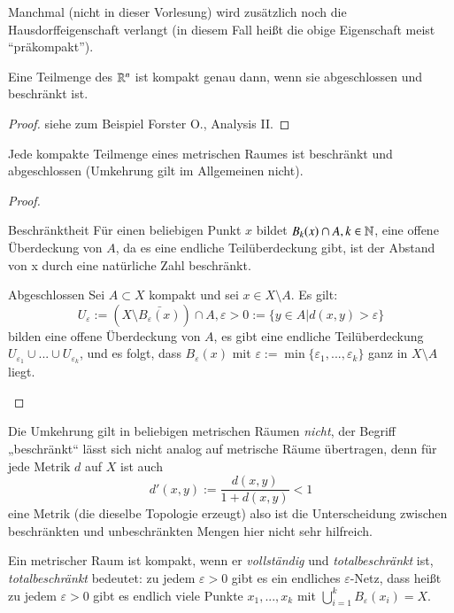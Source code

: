 \documentclass[a4paper,10pt]{scrartcl}
\newcommand{\eps}{\varepsilon}
\begin{document}
\begin{note}\label{thm:6.3}
 Manchmal (nicht in dieser Vorlesung) wird zusätzlich noch die Hausdorffeigenschaft verlangt (in diesem Fall heißt die obige Eigenschaft meist "`präkompakt"').
\end{note}
\begin{st}\label{thm:1.6.4}
 Eine Teilmenge des $\mathbb{R}^n$ ist kompakt genau dann, wenn sie abgeschlossen und beschränkt ist.
\end{st}
\begin{proof}
 siehe zum Beispiel Forster O., Analysis II.
\end{proof}
\begin{st}\label{thm:1.6.5}
 Jede kompakte Teilmenge eines metrischen Raumes ist beschränkt und abgeschlossen (Umkehrung gilt im Allgemeinen nicht).
\end{st}
\begin{proof}
 \begin{seg}{Beschränktheit}
  Für einen beliebigen Punkt $x$ bildet $B_k(x)\cap A, k \in \mathbb{N}$, eine offene Überdeckung von $A$, da es eine endliche Teilüberdeckung gibt, ist der Abstand von x durch eine natürliche Zahl beschränkt.
 \end{seg}
\begin{seg}{Abgeschlossen}
 Sei $A\subset X$ kompakt und sei $x\in X\setminus A$. Es gilt:
\[
 U_\eps:=(X\setminus\bar{B_\eps(x)})\cap A, \eps>0 := \{ y\in A|d(x,y) > \eps\}
\]
bilden eine offene Überdeckung von $A$, es gibt eine endliche Teilüberdeckung $U_{\eps_1}\cup... \cup U_{\eps_k}$, und es folgt, dass $B_\eps(x)$ mit $\eps:=\min\{\eps_1,...,\eps_k\}$ ganz in $X\setminus A$ liegt.

\fixme[fig26]
\end{seg}
\end{proof}
Die Umkehrung gilt in beliebigen metrischen Räumen \emph{nicht}, der Begriff „beschränkt“ lässt sich nicht analog auf metrische Räume übertragen, denn für jede Metrik $d$ auf $X$ ist auch
\[
 d'(x,y):=\frac{d(x,y)}{1+d(x,y)}<1
\]
eine Metrik (die dieselbe Topologie erzeugt) also ist die Unterscheidung zwischen beschränkten und unbeschränkten Mengen hier nicht sehr hilfreich.
\begin{note*}
 Ein metrischer Raum ist kompakt, wenn er \emph{vollständig} und \emph{totalbeschränkt} ist, \emph{totalbeschränkt} bedeutet: zu jedem $\eps>0$ gibt es ein endliches $\eps$-Netz, dass heißt zu jedem $\eps>0$ gibt es endlich viele Punkte $x_1,...,x_k$ mit $\bigcup_{i=1}^kB_\eps(x_i)=X$.
\end{note*}
\end{document}
